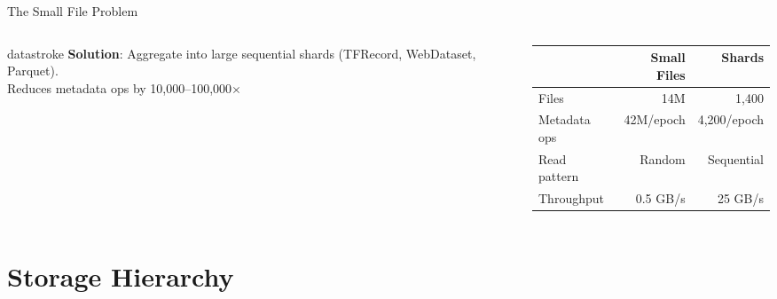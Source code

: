 \documentclass[aspectratio=169, 12pt]{beamer}
\begin{document}
\begin{frame}{The Small File Problem}
\begin{columns}[T]
\begin{column}{0.55\textwidth}
    \vspace{0.1cm}
    \begin{mlsyscard}{datastroke}
    \textbf{Solution}: Aggregate into large sequential shards (TFRecord, WebDataset, Parquet).\\[0.05cm]
    {\footnotesize Reduces metadata ops by 10,000--100,000$\times$}
    \end{mlsyscard}
  \end{column}
  \begin{column}{0.42\textwidth}
    \vspace{0.3cm}
    \renewcommand{\arraystretch}{1.2}
    {\scriptsize
    \begin{tabular}{@{}lrr@{}}
      \toprule
      & \textbf{Small Files} & \textbf{Shards} \\
      \midrule
      Files         & 14M      & 1,400 \\
      Metadata ops  & 42M/epoch & 4,200/epoch \\
      Read pattern  & Random   & Sequential \\
      Throughput    & 0.5 GB/s & 25 GB/s \\
      \bottomrule
    \end{tabular}
    }
  \end{column}
\end{columns}

\end{frame}

\section{Storage Hierarchy}
\end{document}
